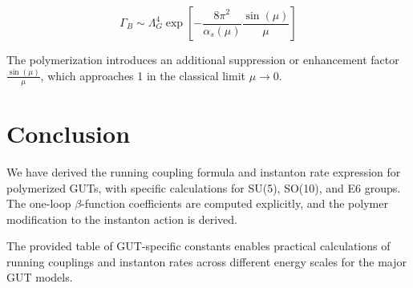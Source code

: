 \documentclass[11pt]{article}
\begin{document}
\begin{equation}
\Gamma_{B} \sim \Lambda_G^4 \exp\left[-\frac{8\pi^2}{\alpha_s(\mu)}\frac{\sin(\mu)}{\mu}\right]
\end{equation}

The polymerization introduces an additional suppression or enhancement factor $\frac{\sin(\mu)}{\mu}$, which approaches 1 in the classical limit $\mu \to 0$.

\section{Conclusion}

We have derived the running coupling formula and instanton rate expression for polymerized GUTs, with specific calculations for SU(5), SO(10), and E6 groups. The one-loop $\beta$-function coefficients are computed explicitly, and the polymer modification to the instanton action is derived.

The provided table of GUT-specific constants enables practical calculations of running couplings and instanton rates across different energy scales for the major GUT models.
\end{document}
